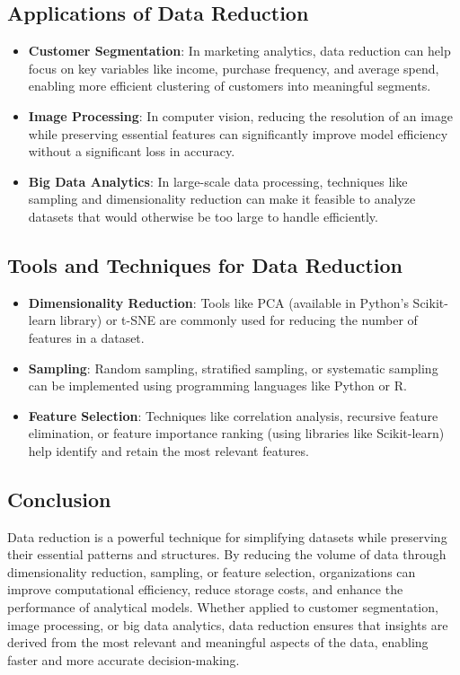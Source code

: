 \documentclass[12pt]{article}
\begin{document}
\subsection{Applications of Data Reduction}

\begin{itemize}
    \item \textbf{Customer Segmentation}: In marketing analytics, data reduction can help focus on key variables like income, purchase frequency, and average spend, enabling more efficient clustering of customers into meaningful segments.
    \item \textbf{Image Processing}: In computer vision, reducing the resolution of an image while preserving essential features can significantly improve model efficiency without a significant loss in accuracy.
    \item \textbf{Big Data Analytics}: In large-scale data processing, techniques like sampling and dimensionality reduction can make it feasible to analyze datasets that would otherwise be too large to handle efficiently.
\end{itemize}

\subsection{Tools and Techniques for Data Reduction}

\begin{itemize}
    \item \textbf{Dimensionality Reduction}: Tools like PCA (available in Python’s Scikit-learn library) or t-SNE are commonly used for reducing the number of features in a dataset.
    \item \textbf{Sampling}: Random sampling, stratified sampling, or systematic sampling can be implemented using programming languages like Python or R.
    \item \textbf{Feature Selection}: Techniques like correlation analysis, recursive feature elimination, or feature importance ranking (using libraries like Scikit-learn) help identify and retain the most relevant features.
\end{itemize}

\subsection{Conclusion}

Data reduction is a powerful technique for simplifying datasets while preserving their essential patterns and structures. By reducing the volume of data through dimensionality reduction, sampling, or feature selection, organizations can improve computational efficiency, reduce storage costs, and enhance the performance of analytical models. Whether applied to customer segmentation, image processing, or big data analytics, data reduction ensures that insights are derived from the most relevant and meaningful aspects of the data, enabling faster and more accurate decision-making.
\end{document}
